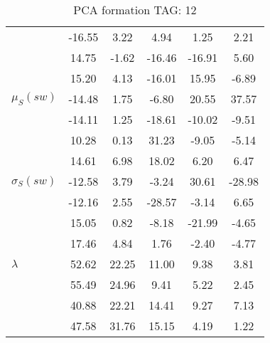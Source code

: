 \begin{table}[h!]
\begin{center}
\begin{tabular}{| l || c | c | c | c | c |}
 & -16.55  & 3.22  & 4.94  & 1.25  & 2.21 \\
 & 14.75  & -1.62  & -16.46  & -16.91  & 5.60 \\
 & 15.20  & 4.13  & -16.01  & 15.95  & -6.89 \\\hline
$\mu_S(sw)$ & -14.48  & 1.75  & -6.80  & 20.55  & 37.57 \\
 & -14.11  & 1.25  & -18.61  & -10.02  & -9.51 \\
 & 10.28  & 0.13  & 31.23  & -9.05  & -5.14 \\
 & 14.61  & 6.98  & 18.02  & 6.20  & 6.47 \\\hline
$\sigma_S(sw)$ & -12.58  & 3.79  & -3.24  & 30.61  & -28.98 \\
 & -12.16  & 2.55  & -28.57  & -3.14  & 6.65 \\
 & 15.05  & 0.82  & -8.18  & -21.99  & -4.65 \\
 & 17.46  & 4.84  & 1.76  & -2.40  & -4.77 \\\hline\hline
$\lambda$ & 52.62  & 22.25  & 11.00  & 9.38  & 3.81 \\
 & 55.49  & 24.96  & 9.41  & 5.22  & 2.45 \\
 & 40.88  & 22.21  & 14.41  & 9.27  & 7.13 \\
 & 47.58  & 31.76  & 15.15  & 4.19  & 1.22 \\\hline
\end{tabular}
\caption{PCA formation TAG: 12}
\end{center}
\end{table}